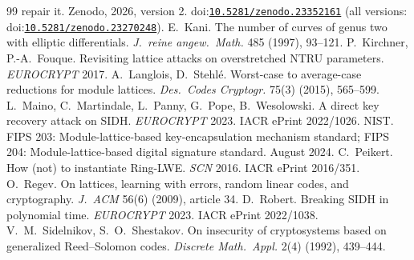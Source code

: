 \documentclass[11pt]{article}
\makeatletter
\theoremstyle{remark}
\DeclareRobustCommand{\_}{%
  \edef\@tempa{\ttdefault}%
  \ifx\f@family\@tempa\char95 \else\textunderscore\fi\penalty300\relax}
\newcommand{\doi}[1]{\href{https://doi.org/#1}{\nolinkurl{#1}}}
\makeatother
\begin{document}
\begin{thebibliography}{99}
  repair it. Zenodo, 2026, version 2. doi:\doi{10.5281/zenodo.23352161} (all versions:
  doi:\doi{10.5281/zenodo.23270248}).
 E.~Kani. The number of curves of genus two with elliptic differentials. \emph{J.\ reine angew.\ Math.}
  485 (1997), 93--121.
 P.~Kirchner, P.-A.~Fouque. Revisiting lattice attacks on overstretched NTRU parameters.
  \emph{EUROCRYPT} 2017.
 A.~Langlois, D.~Stehl\'e. Worst-case to average-case reductions for module lattices.
  \emph{Des.\ Codes Cryptogr.} 75(3) (2015), 565--599.
 L.~Maino, C.~Martindale, L.~Panny, G.~Pope, B.~Wesolowski. A direct key recovery attack on SIDH.
  \emph{EUROCRYPT} 2023. IACR ePrint 2022/1026.
 NIST. FIPS 203: Module-lattice-based key-encapsulation mechanism standard; FIPS 204: Module-lattice-based
  digital signature standard. August 2024.
 C.~Peikert. How (not) to instantiate Ring-LWE. \emph{SCN} 2016. IACR ePrint 2016/351.
 O.~Regev. On lattices, learning with errors, random linear codes, and cryptography.
  \emph{J.\ ACM} 56(6) (2009), article 34.
 D.~Robert. Breaking SIDH in polynomial time. \emph{EUROCRYPT} 2023. IACR ePrint 2022/1038.
 V.~M.~Sidelnikov, S.~O.~Shestakov. On insecurity of cryptosystems based on generalized Reed--Solomon
  codes. \emph{Discrete Math.\ Appl.} 2(4) (1992), 439--444.
\end{thebibliography}
\end{document}
